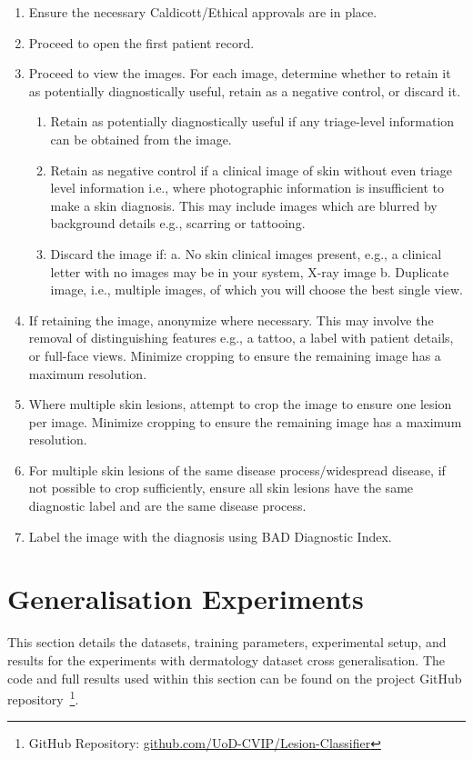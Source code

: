 \begin{enumerate}
	\item Ensure the necessary Caldicott/Ethical approvals are in place. 
	\item Proceed to open the first patient record.
	\item Proceed to view the images. For each image, determine whether to retain it as potentially diagnostically useful, retain as a negative control, or discard it.
	\begin{enumerate}
		\item Retain as potentially diagnostically useful if any triage-level information can be obtained from the image.
		\item Retain as negative control if a clinical image of skin without even triage level information i.e., where photographic information is insufficient to make a skin diagnosis. This may include images which are blurred by background details e.g., scarring or tattooing.
		\item Discard the image if: a. No skin clinical images present, e.g., a clinical letter with no images may be in your system, X-ray image b. Duplicate image, i.e., multiple images, of which you will choose the best single view.
	\end{enumerate}
	\item If retaining the image, anonymize where necessary. This may involve the removal of distinguishing features e.g., a tattoo, a label with patient details, or full-face views. Minimize cropping to ensure the remaining image has a maximum resolution. 
	\item Where multiple skin lesions, attempt to crop the image to ensure one lesion per image. Minimize cropping to ensure the remaining image has a maximum resolution.
	\item For multiple skin lesions of the same disease process/widespread disease, if not possible to crop sufficiently, ensure all skin lesions have the same diagnostic label and are the same disease process.
	\item Label the image with the diagnosis using BAD Diagnostic Index.
\end{enumerate}



\section{Generalisation Experiments}
\label{sec:generalisation_experiments}
This section details the datasets, training parameters, experimental setup, and results for the experiments with dermatology dataset cross generalisation. The code and full results used within this section can be found on the project GitHub repository~\footnote{GitHub Repository: \url{github.com/UoD-CVIP/Lesion-Classifier}}.

